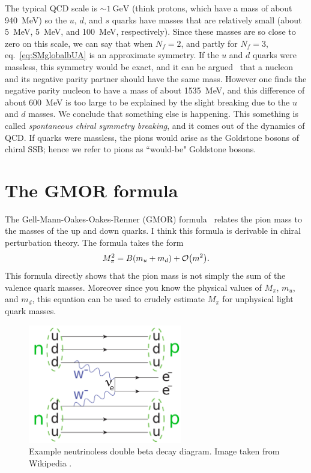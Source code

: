 The typical QCD scale is $\sim1~\text{GeV}$ (think protons, which have a 
mass of about 940~MeV) so the $u$, $d$, and $s$ quarks have masses that
are relatively small (about 5~MeV, 5~MeV, and 100~MeV, respectively).
Since these masses are so close to zero on this scale, we can say that
when $N_f=2$, and partly for $N_f=3$, eq.~\eqref{eq:SMglobalbUA} is
an approximate symmetry. If the $u$ and $d$ quarks were massless, this symmetry
would be exact, and it can be argued~\cite{gattringer_quantum_2010} that
a nucleon and its negative parity partner should have the same mass. 
However one finds the negative parity nucleon to have
a mass of about 1535~MeV, and this difference of about 600~MeV is too large to
be explained by the slight breaking due to the $u$ and $d$ masses. We
conclude that something else is happening. This something is called 
{\it spontaneous chiral symmetry breaking}, and it comes out of the
dynamics of QCD. If quarks were massless, the pions would arise as 
the Goldstone bosons of chiral SSB; hence we refer to pions as 
``would-be" Goldstone bosons.

\section{The GMOR formula}

The Gell-Mann-Oakes-Oakes-Renner (GMOR) formula~\cite{gell-mann_behavior_1968}
relates the pion mass to the masses of the up and down quarks. I think
this formula is derivable in chiral perturbation theory. The formula
takes the form
\begin{equation}
  M_\pi^2= B(m_u+m_d)+\order{m^2}.
\end{equation}
This formula directly shows that the pion mass is not simply the sum of
the valence quark masses. Moreover since you know the physical values
of $M_\pi$, $m_u$, and $m_d$, this equation can be used to crudely estimate
$M_\pi$ for unphysical light quark masses.

\begin{figure}[t]\label{fig:ndbd}
\centering
\includegraphics[width=0.6\textwidth]{figs/2560px-Double_beta_decay_feynman.svg.png}
\caption{Example neutrinoless double beta decay diagram. Image taken
         from Wikipedia \cite{wiki:ndbd}.}
\end{figure}


